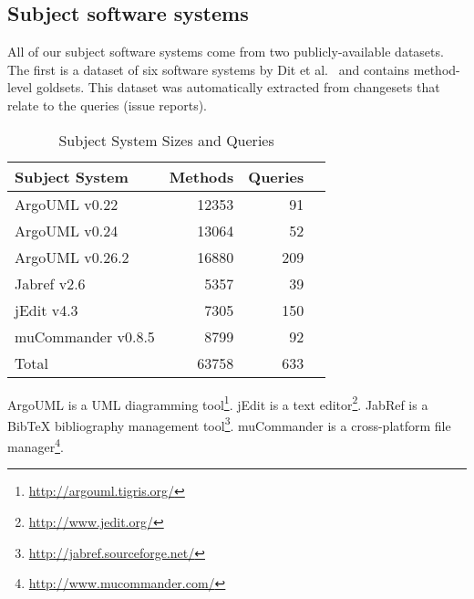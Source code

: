 
%


%
%
\subsection{Subject software systems}

All of our subject software systems come from two publicly-available datasets.
The first is a dataset of six software systems by Dit et
al.~\cite{Dit-etal_2013} and contains method-level goldsets.  This dataset was
automatically extracted from changesets that relate to the queries (issue
reports).

\begin{table}[t]
\renewcommand{\arraystretch}{1.3}
\footnotesize
\centering
\caption{Subject System Sizes and Queries}
\begin{tabular}{lrrr}
    \toprule
    Subject System     & Methods & Queries    \\    %
    \midrule                                        %
    ArgoUML v0.22      & 12353    & 91        \\    %
    ArgoUML v0.24      & 13064    & 52        \\    %
    ArgoUML v0.26.2    & 16880    & 209       \\    %
    Jabref v2.6        & 5357     & 39        \\    %
    jEdit v4.3         & 7305     & 150       \\    %
    muCommander v0.8.5 & 8799     & 92        \\    %
    \midrule                                        %
    Total              & 63758    & 633       \\    %
    \bottomrule
\end{tabular}
\label{table:subjects}
\end{table}


ArgoUML is a UML diagramming tool\footnote{\url{http://argouml.tigris.org/}}.
jEdit is a text editor\footnote{\url{http://www.jedit.org/}}.
JabRef is a BibTeX bibliography management tool\footnote{\url{http://jabref.sourceforge.net/}}.
muCommander is a cross-platform file manager\footnote{\url{http://www.mucommander.com/}}.

